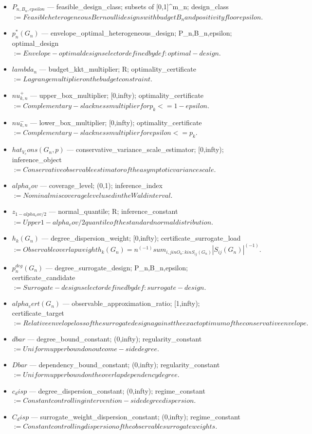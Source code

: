 \documentclass{article}
\begin{document}
\begin{itemize}
  \item $P_{n,B_n,epsilon}$ --- feasible_design_class; subsets of [0,1]^{m_n}; design_class $:= Feasible heterogeneous Bernoulli designs with budget B_n and positivity floor epsilon.$
  \item $p_n^*(G_n)$ --- envelope_optimal_heterogeneous_design; P_{n,B_n,epsilon}; optimal_design $:= Envelope-optimal design selector defined by def:optimal-design.$
  \item $lambda_n$ --- budget_kkt_multiplier; R; optimality_certificate $:= Lagrange multiplier on the budget constraint.$
  \item $nu_{k,n}^+$ --- upper_box_multiplier; [0,infty); optimality_certificate $:= Complementary-slackness multiplier for p_k <= 1-epsilon.$
  \item $nu_{k,n}^-$ --- lower_box_multiplier; [0,infty); optimality_certificate $:= Complementary-slackness multiplier for epsilon <= p_k.$
  \item $hat_V_cons(G_n,p)$ --- conservative_variance_scale_estimator; [0,infty); inference_object $:= Conservative observable estimator of the asymptotic variance scale.$
  \item $alpha_cov$ --- coverage_level; (0,1); inference_index $:= Nominal miscoverage level used in the Wald interval.$
  \item $z_{1-alpha_cov/2}$ --- normal_quantile; R; inference_constant $:= Upper 1-alpha_cov/2 quantile of the standard normal distribution.$
  \item $h_k(G_n)$ --- degree_dispersion_weight; [0,infty); certificate_surrogate_load $:= Observable overlap weight h_k(G_n) = n^(-1) sum_{i,j in O_n : k in S_{ij}(G_n)} |S_{ij}(G_n)|^(-1).$
  \item $p_n^{deg}(G_n)$ --- degree_surrogate_design; P_{n,B_n,epsilon}; certificate_candidate $:= Surrogate-design selector defined by def:surrogate-design.$
  \item $alpha_cert(G_n)$ --- observable_approximation_ratio; [1,infty); certificate_target $:= Relative envelope loss of the surrogate design against the exact optimum of the conservative envelope.$
  \item $dbar$ --- degree_bound_constant; (0,infty); regularity_constant $:= Uniform upper bound on outcome-side degree.$
  \item $Dbar$ --- dependency_bound_constant; (0,infty); regularity_constant $:= Uniform upper bound on the overlap dependency degree.$
  \item $c_disp$ --- degree_dispersion_constant; (0,infty); regime_constant $:= Constant controlling intervention-side degree dispersion.$
  \item $C_disp$ --- surrogate_weight_dispersion_constant; (0,infty); regime_constant $:= Constant controlling dispersion of the observable surrogate weights.$
\end{itemize}
\end{document}
